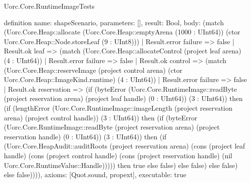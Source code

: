 \begin{lexlean}{Uorc.Core.RuntimeImageTests}
\begin{semanticmodule}
definition{
  name: shapeScenario,
  parameters: [],
  result: Bool,
  body: (match (Uorc.Core.Heap::allocate (Uorc.Core.Heap::emptyArena (1000 : UInt64)) (ctor Uorc.Core.Heap::Node.storeLeaf (9 : UInt8)))
    | Result.error failure => false
    | Result.ok leaf => (match (Uorc.Core.Heap::allocateControl (project leaf arena) (4 : UInt64))
      | Result.error failure => false
      | Result.ok control => (match (Uorc.Core.Heap::reserveImage (project control arena) (ctor Uorc.Core.Heap::ImageKind.runtime) (4 : UInt64))
        | Result.error failure => false
        | Result.ok reservation => (if (byteError (Uorc.Core.RuntimeImage::readByte (project reservation arena) (project leaf handle) (0 : UInt64)) (3 : UInt64)) then (if (lengthError (Uorc.Core.RuntimeImage::imageLength (project reservation arena) (project control handle)) (3 : UInt64)) then (if (byteError (Uorc.Core.RuntimeImage::readByte (project reservation arena) (project reservation handle) (0 : UInt64)) (3 : UInt64)) then (if (Uorc.Core.HeapAudit::auditRoots (project reservation arena) (cons (project leaf handle) (cons (project control handle) (cons (project reservation handle) (nil Uorc.Core.RuntimeValue::Handle))))) then true else false) else false) else false) else false)))),
  axioms: [Quot.sound, propext],
  executable: true
}


\end{semanticmodule}
\end{lexlean}
